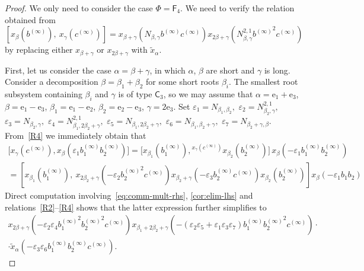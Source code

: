 \documentclass{article}
\numberwithin{equation}{section}
\theoremstyle{definition}
\theoremstyle{remark}
\newcommand{\up}[2]{{^{#1}\!{#2}}}
\newcommand{\rC}{\mathsf{C}}
\newcommand{\rF}{\mathsf{F}}
\begin{document}
\begin{proof}
We only need to consider the case $\Phi = \rF_4$.
We need to verify the relation obtained from \begin{equation}\label{eq:elim-rhs-r4-1} [x_{\beta}(b^{(\infty)}),\ x_{\gamma}(c^{(\infty)})] = x_{\beta+\gamma}(N_{\beta,\gamma}b^{(\infty)} c^{(\infty)}) x_{2\beta+\gamma}(N_{\beta,\gamma}^{2,1}{b^{(\infty)}}^2c^{(\infty)})\end{equation} by replacing either $x_{\beta+\gamma}$ or $x_{2\beta+\gamma}$ with $\widetilde{x}_{\alpha}$.

First, let us consider the case \(\alpha = \beta + \gamma\), in which \(\alpha\), \(\beta\) are short and \(\gamma\) is long. Consider a decomposition \(\beta = \beta_1 + \beta_2\) for some short roots \(\beta_i\). The smallest root subsystem containing \(\beta_i\) and \(\gamma\) is of type \(\rC_3\), so we may assume that \(\alpha = \mathrm e_1 + \mathrm e_3\), \(\beta = \mathrm e_1 - \mathrm e_3\), \(\beta_1 = \mathrm e_1 - \mathrm e_2\), \(\beta_2 = \mathrm e_2 - \mathrm e_3\), \(\gamma = 2\mathrm e_3\). Set $\varepsilon_1 = N_{\beta_1, \beta_2},$ $\varepsilon_2 = N_{\beta_2,\gamma}^{2,1},$ $\varepsilon_3 = N_{\beta_2, \gamma},$ $\varepsilon_4 = N_{\beta_1, 2\beta_2+\gamma}^{2,1},$ $\varepsilon_5 = N_{\beta_1, 2\beta_2+\gamma},$ $\varepsilon_6 = N_{\beta_1,\beta_2+\gamma},$ $\varepsilon_7 = N_{\beta_2+\gamma, \beta}.$ From~\eqref{R4} we immediately obtain that
 \begin{multline*}
  \bigl[x_\gamma(c^{(\infty)}), x_\beta(\varepsilon_1 b_1^{(\infty)} b_2^{(\infty)})\bigr]
  = \bigl[x_{\beta_1}(b_1^{(\infty)}), \up{x_\gamma(c^{(\infty)})} {x_{\beta_2}(b_2^{(\infty)})}\bigr]\,
  x_\beta(-\varepsilon_1 b_1^{(\infty)} b_2^{(\infty)}) \\
  =[x_{\beta_1}(b_1^{(\infty)}),\ x_{2\beta_2+\gamma}(-\varepsilon_2{b_2^{(\infty)}}^2c^{(\infty)}) x_{\beta_2+\gamma}(-\varepsilon_3b_2^{(\infty)}c^{(\infty)}) x_{\beta_2}(b_2^{(\infty)})] x_{\beta}(-\varepsilon_1b_1b_2) \end{multline*}
 Direct computation involving~\eqref{eq:comm-mult-rhs}, \cref{cor:elim-lhs} and relations~\eqref{R2}--\eqref{R4} shows that the latter expression further simplifies to
 \begin{multline*}  x_{2\beta + \gamma}( - \varepsilon_2 \varepsilon_4 {b_1^{(\infty)}}^2{b_2^{(\infty)}}^2c^{(\infty)}) x_{\beta_1 + 2\beta_2 + \gamma}(-(\varepsilon_2\varepsilon_5 +\varepsilon_1\varepsilon_3\varepsilon_7) b_1^{(\infty)}{b_2^{(\infty)}}^2c^{(\infty)}) \cdot \\ \cdot \widetilde{x}_{\alpha}(-\varepsilon_3 \varepsilon_6 b_1^{(\infty)}b_2^{(\infty)}c^{(\infty)}).\end{multline*}

\end{proof}
\end{document}

